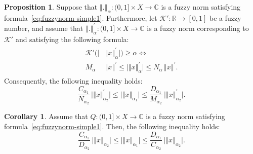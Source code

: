\documentclass[preprint,12pt]{elsarticle}
\newcommand{\norm}[1]{\left\Vert#1\right\Vert}
\theoremstyle{definition}
\newtheorem{proposition}{Proposition}[section]
\newtheorem{corollary}[theorem]{Corollary}
\begin{document}
\begin{proposition}
	Suppose that $\norm{.}_\alpha:(0,1]\times X \to \mathbb{C}$ is a fuzzy norm satisfying formula~\eqref{eq:fuzzynorm-simple1}.  
	Furthermore, let $\mathcal{K}':\mathbb{R} \to [0,1]$ be a fuzzy number, and assume that 
	$\norm{.}^\prime_\alpha:(0,1]\times X \to \mathbb{C}$ is a fuzzy norm corresponding to $\mathcal{K}'$ and satisfying the following formula:
	\begin{align}
		\begin{split}
	\mathcal{K}'(\big|&\norm{x}^\prime_\alpha\big|\bigr) \geq \alpha 
			\Leftrightarrow\\ 
			M_\alpha\, &\norm{x}^{\prime}\leq \big|\norm{x}^\prime_\alpha\big| 
			\leq N_\alpha\, \norm{x}^{\prime}.
		\end{split}
	\end{align}
	Consequently, the following inequality holds:
	\begin{equation}
		\frac{C_{\alpha_1}}{N_{\alpha_2}}\, \big|\norm{x}^\prime_{\alpha_2}\big|
		\leq \big|\norm{x}_{\alpha_1}\big|
		\leq \frac{D_{\alpha_1}}{M_{\alpha_2}}\, \big|\norm{x}^\prime_{\alpha_2}\big|.
	\end{equation}
\end{proposition}

\begin{corollary}
	Assume that $Q:(0,1]\times X \to \mathbb{C}$ is a fuzzy norm satisfying formula~\eqref{eq:fuzzynorm-simple1}. 
	Then, the following inequality holds:
	\begin{equation}
		\frac{C_{\alpha_1}}{D_{\alpha_2}}\, \big|\norm{x}_{\alpha_2}\big|
		\leq \big|\norm{x}_{\alpha_1}\big|
		\leq \frac{D_{\alpha_1}}{C_{\alpha_2}}\, \big|\norm{x}_{\alpha_2}\big|.
	\end{equation}
	
\end{corollary}
\end{document}
